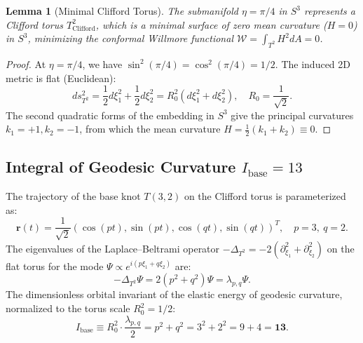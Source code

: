 \documentclass[12pt,a4paper]{article}
\newtheorem{lemma}{Lemma}
\begin{document}
	\begin{lemma}[Minimal Clifford Torus]
	The submanifold $\eta = \pi/4$ in $S^3$ represents a Clifford torus $T^2_{\mathrm{Clifford}}$, which is a minimal surface of zero mean curvature ($H=0$) in $S^3$, minimizing the conformal Willmore functional $\mathcal{W} = \int_{T^2} H^2 dA = 0$.
	\end{lemma}
	
	\begin{proof}
	At $\eta = \pi/4$, we have $\sin^2(\pi/4) = \cos^2(\pi/4) = 1/2$. The induced 2D metric is flat (Euclidean):
	\begin{equation}
	ds^2_{T^2} = \frac{1}{2} d\xi_1^2 + \frac{1}{2} d\xi_2^2 = R_0^2 (d\xi_1^2 + d\xi_2^2), \quad R_0 = \frac{1}{\sqrt{2}}.
	\end{equation}
	The second quadratic forms of the embedding in $S^3$ give the principal curvatures $k_1 = +1, k_2 = -1$, from which the mean curvature $H = \frac{1}{2}(k_1 + k_2) \equiv 0$.
	\end{proof}
	
	\subsection{Integral of Geodesic Curvature $I_{\text{base}} = 13$}
	The trajectory of the base knot $T(3,2)$ on the Clifford torus is parameterized as:
	\begin{equation}
		\mathbf{r}(t) = \frac{1}{\sqrt{2}} \left( \cos(pt), \sin(pt), \cos(qt), \sin(qt) \right)^T, \quad p=3, \ q=2.
	\end{equation}
	The eigenvalues of the Laplace--Beltrami operator $-\Delta_{T^2} = -2(\partial_{\xi_1}^2 + \partial_{\xi_2}^2)$ on the flat torus for the mode $\Psi \propto e^{i(p\xi_1 + q\xi_2)}$ are:
	\begin{equation}
		-\Delta_{T^2} \Psi = 2 (p^2 + q^2) \Psi = \lambda_{p,q} \Psi.
	\end{equation}
	The dimensionless orbital invariant of the elastic energy of geodesic curvature, normalized to the torus scale $R_0^2 = 1/2$:
	\begin{equation}
		I_{\text{base}} \equiv R_0^2 \cdot \frac{\lambda_{p,q}}{2} = p^2 + q^2 = 3^2 + 2^2 = 9 + 4 = \mathbf{13}.
	\end{equation}
	
\end{document}
